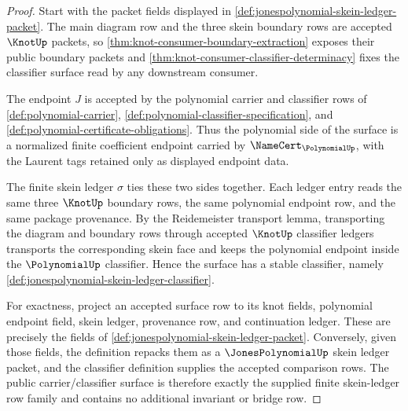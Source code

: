 \begin{proof}
Start with the packet fields displayed in
\autoref{def:jonespolynomial-skein-ledger-packet}. The main diagram row and
the three skein boundary rows are accepted $\KnotUp$ packets, so
\autoref{thm:knot-consumer-boundary-extraction} exposes their public boundary
packets and \autoref{thm:knot-consumer-classifier-determinacy} fixes the
classifier surface read by any downstream consumer.

The endpoint $J$ is accepted by the polynomial carrier and classifier rows of
\autoref{def:polynomial-carrier},
\autoref{def:polynomial-classifier-specification}, and
\autoref{def:polynomial-certificate-obligations}. Thus the polynomial side of
the surface is a normalized finite coefficient endpoint carried by
$\NameCert_{\PolynomialUp}$, with the Laurent tags retained only as displayed
endpoint data.

The finite skein ledger $\sigma$ ties these two sides together. Each ledger
entry reads the same three $\KnotUp$ boundary rows, the same polynomial
endpoint row, and the same package provenance. By the Reidemeister transport
lemma, transporting the diagram and boundary rows through accepted $\KnotUp$
classifier ledgers transports the corresponding skein face and keeps the
polynomial endpoint inside the $\PolynomialUp$ classifier. Hence the surface
has a stable classifier, namely
\autoref{def:jonespolynomial-skein-ledger-classifier}.

For exactness, project an accepted surface row to its knot fields, polynomial
endpoint field, skein ledger, provenance row, and continuation ledger. These
are precisely the fields of
\autoref{def:jonespolynomial-skein-ledger-packet}. Conversely, given those
fields, the definition repacks them as a $\JonesPolynomialUp$ skein ledger
packet, and the classifier definition supplies the accepted comparison rows.
The public carrier/classifier surface is therefore exactly the supplied finite
skein-ledger row family and contains no additional invariant or bridge row.
\end{proof}

